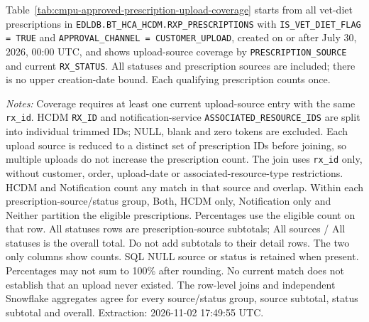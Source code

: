 \label{subsec:cmpu-approved-prescription-upload-coverage}
Table~\ref{tab:cmpu-approved-prescription-upload-coverage} starts from all vet-diet prescriptions in \texttt{EDLDB.BT\_HCA\_HCDM.RXP\_PRESCRIPTIONS} with \texttt{IS\_VET\_DIET\_FLAG = TRUE} and \texttt{APPROVAL\_CHANNEL = CUSTOMER\_UPLOAD}, created on or after July 30, 2026, 00:00 UTC, and shows upload-source coverage by \texttt{PRESCRIPTION\_SOURCE} and current \texttt{RX\_STATUS}. All statuses and prescription sources are included; there is no upper creation-date bound. Each qualifying prescription counts once.

\noindent\textit{Notes:} Coverage requires at least one current upload-source entry with the same \texttt{rx\_id}. HCDM \texttt{RX\_ID} and notification-service \texttt{ASSOCIATED\_RESOURCE\_IDS} are split into individual trimmed IDs; NULL, blank and zero tokens are excluded. Each upload source is reduced to a distinct set of prescription IDs before joining, so multiple uploads do not increase the prescription count. The join uses \texttt{rx\_id} only, without customer, order, upload-date or associated-resource-type restrictions. HCDM and Notification count any match in that source and overlap. Within each prescription-source/status group, Both, HCDM only, Notification only and Neither partition the eligible prescriptions. Percentages use the eligible count on that row. All statuses rows are prescription-source subtotals; All sources / All statuses is the overall total. Do not add subtotals to their detail rows. The two only columns show counts. SQL NULL source or status is retained when present. Percentages may not sum to 100\% after rounding. No current match does not establish that an upload never existed. The row-level joins and independent Snowflake aggregates agree for every source/status group, source subtotal, status subtotal and overall. Extraction: 2026-11-02 17:49:55 UTC.



\clearpage
